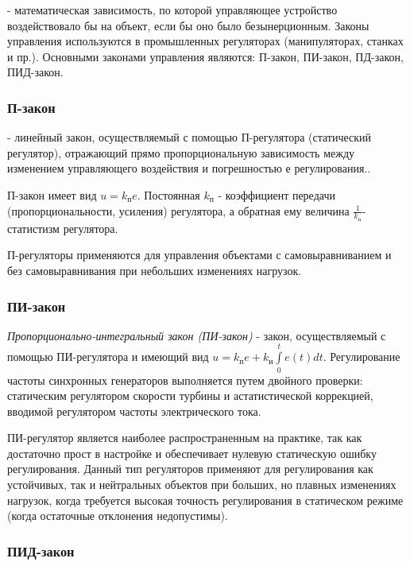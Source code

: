 \documentclass[TAU.tex]{subfiles}
\begin{document}
 - математическая зависимость, по которой управляющее устройство воздействовало бы на объект, если бы оно было безынерционным. Законы управления используются в промышленных регуляторах (манипуляторах, станках и пр.). Основными законами управления являются: П-закон, ПИ-закон, ПД-закон, ПИД-закон.

\subsubsection{П-закон}

 - линейный закон, осуществляемый с помощью П-регулятора (статический регулятор), отражающий прямо пропорциональную зависимость между изменением управляющего воздействия и погрешностью $е$ регулирования.. \par
П-закон имеет вид $u = k_{\text{п}} e$.  Постоянная $k_{\text{п}}$ - коэффициент передачи (пропорциональности, усиления) регулятора, а обратная ему величина $\frac{1}{k_{\text{п}}}$- статистизм регулятора.  \par
П-регуляторы применяются для управления объектами с самовыравниванием и без самовыравнивания при небольших изменениях нагрузок. 


\subsubsection{ПИ-закон}

{\it Пропорционально-интегральный закон (ПИ-закон)} - закон, осуществляемый с помощью ПИ-регулятора и имеющий вид $u=k_\text{п}e+ k_\text{и}\int\limits_0^t e(t) dt$.  Регулирование частоты синхронных генераторов выполняется путем двойного проверки: статическим регулятором скорости турбины и астатистической коррекцией, вводимой регулятором частоты электрического тока. \par
ПИ-регулятор является наиболее распространенным на практике, так как достаточно прост в настройке и обеспечивает нулевую статическую ошибку регулирования. Данный тип регуляторов применяют для регулирования как устойчивых, так и нейтральных объектов при больших, но плавных изменениях нагрузок, когда требуется высокая точность регулирования в статическом режиме (когда остаточные отклонения недопустимы).


\subsubsection{ПИД-закон}
\end{document}
